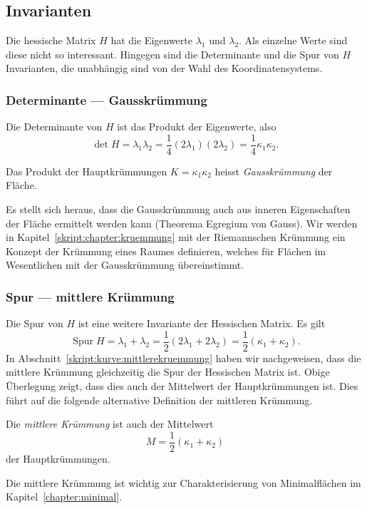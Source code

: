 \subsection{Invarianten}
Die hessische Matrix $H$ hat die Eigenwerte $\lambda_1$ und $\lambda_2$.
Als einzelne Werte sind diese nicht so interessant.
Hingegen sind die Determinante und die Spur von $H$ Invarianten, die
unabhängig sind von der Wahl des Koordinatensystems.

\subsubsection{Determinante --- Gausskrümmung}
%
%
%
Die Determinante von $H$ ist das Produkt der Eigenwerte, also
\[
\det H
=
\lambda_1\lambda_2
=
\frac14 (2\lambda_1) (2\lambda_2)
=
\frac14 \kappa_1\kappa_2.
\]
\begin{definition}
\label{skript:definition:gausskruemmung}
Das Produkt der Hauptkrümmungen $K=\kappa_1\kappa_2$
heisst {\em Gausskrümmung} der Fläche.
\end{definition}
Es stellt sich heraus, dass die Gausskrümmung auch aus inneren Eigenschaften
der Fläche ermittelt werden kann
(Theorema Egregium von Gauss).
Wir werden in Kapitel~\ref{skript:chapter:kruemmung} 
mit der Riemannschen Krümmung ein Konzept der Krümmung eines Raumes
definieren, welches für Flächen im Wesentlichen mit der Gausskrümmung
übereinstimmt.

\subsubsection{Spur --- mittlere Krümmung}
%
%
%
Die Spur von $H$ ist eine weitere Invariante der Hessischen Matrix.
Es gilt
\[
\operatorname{Spur} H
=
\lambda_1+\lambda_2
=
\frac12(2\lambda_1+2\lambda_2)
=
\frac12(\kappa_1+\kappa_2).
\]
In Abschnitt~\ref{skript:kurve:mittlerekruemmung} haben wir nachgeweisen,
dass die mittlere Krümmung gleichzeitig die Spur der Hessischen Matrix ist.
Obige Überlegung zeigt, dass dies auch der Mittelwert der Hauptkrümmungen ist.
Dies führt auf die folgende alternative Definition der mittleren Krümmung.

\begin{definition}
\label{skript:definition:mittlerekruemmung2}
Die {\em mittlere Krümmung} ist auch der Mittelwert
\[
M=\frac12(\kappa_1+\kappa_2)
\]
der Hauptkrümmungen.
\end{definition}
Die mittlere Krümmung ist wichtig zur Charakterisierung von Minimalflächen
im Kapitel~\ref{chapter:minimal}.

